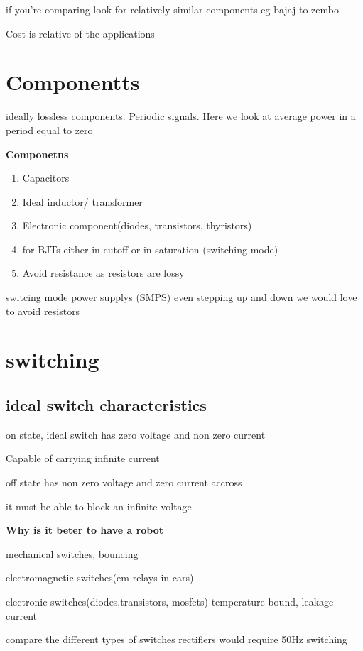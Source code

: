 \documentclass{article}
\begin{document}
    if you're comparing look for relatively similar components eg bajaj to zembo

    Cost is relative of the applications

    \section{Componentts}
    ideally lossless components. Periodic signals. Here we look at average power in a period equal to zero

    \textbf{Componetns}
    \begin{enumerate}
        \item Capacitors
        \item Ideal inductor/ transformer
        \item Electronic component(diodes, transistors, thyristors)
        \item for BJTs either in cutoff or in saturation (switching mode)
        \item Avoid resistance as resistors are lossy
    \end{enumerate}
    switcing mode power supplys (SMPS)
    even stepping up and down we would love to avoid resistors

    \section{switching}

    \subsection{ideal switch characteristics}
     on state, ideal switch has zero voltage and non zero current

     Capable of carrying infinite current

     off state has non zero voltage and zero current accross

     it must be able to block an infinite voltage


     \textbf{Why is it beter to have a robot}

     mechanical switches, bouncing

     electromagnetic switches(em relays in cars)

     electronic switches(diodes,transistors, mosfets) temperature bound, leakage current

     compare the different types of switches
     rectifiers would require 50Hz switching
\end{document}
